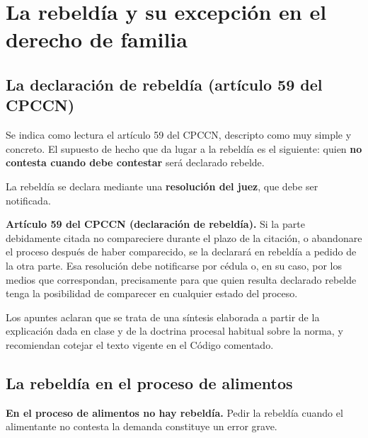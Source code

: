 \documentclass[12pt,oneside]{book}
\begin{document}
\chapter{La rebeld\'ia y su excepci\'on en el derecho de familia}

\section{La declaraci\'on de rebeld\'ia (art\'iculo 59 del CPCCN)}

Se indica como lectura el art\'iculo 59 del CPCCN, descripto como muy simple y concreto. El supuesto de hecho que da lugar a la rebeld\'ia es el siguiente: quien \textbf{no contesta cuando debe contestar} ser\'a declarado rebelde.

La rebeld\'ia se declara mediante una \textbf{resoluci\'on del juez}, que debe ser notificada.

\begin{important}
\textbf{Art\'iculo 59 del CPCCN (declaraci\'on de rebeld\'ia).} Si la parte debidamente citada no compareciere durante el plazo de la citaci\'on, o abandonare el proceso despu\'es de haber comparecido, se la declarar\'a en rebeld\'ia a pedido de la otra parte. Esa resoluci\'on debe notificarse por c\'edula o, en su caso, por los medios que correspondan, precisamente para que quien resulta declarado rebelde tenga la posibilidad de comparecer en cualquier estado del proceso.

Los apuntes aclaran que se trata de una s\'intesis elaborada a partir de la explicaci\'on dada en clase y de la doctrina procesal habitual sobre la norma, y recomiendan cotejar el texto vigente en el C\'odigo comentado.
\end{important}

\section{La rebeld\'ia en el proceso de alimentos}

\begin{important}
\textbf{En el proceso de alimentos no hay rebeld\'ia.} Pedir la rebeld\'ia cuando el alimentante no contesta la demanda constituye un error grave.
\end{important}
\end{document}
